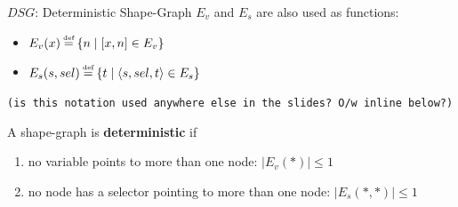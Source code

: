 \documentclass[xcolor={usenames,dvipsnames}]{beamer}
\newcommand{\TODO}[1]{\texttt{\textcolor{YellowOrange}{(#1)}}}
\newcommand\defeq{\stackrel{\mathclap{\tiny\mbox{def}}}{=}}
\begin{document}
\begin{frame}[fragile]{$DSG$: Deterministic Shape-Graph}
  $E_v$ and $E_s$ are also used as functions:
  \begin{itemize}
  \item $E_v(x) \defeq \left\{ n \mid \left[x, n\right] \in E_v \right\}$
  \item $E_s(s, sel) \defeq \left\{ t \mid \langle s, sel, t \rangle \in E_s \right\}$
  \end{itemize}
  \TODO{is this notation used anywhere else in the slides? O/w inline
    below?}

  \vspace{1em}

  A shape-graph is \textbf{deterministic} if
  \begin{enumerate}
  \item no variable points to more than one node: $ |E_v(*)| \leq 1$
  \item no node has a selector pointing to more than one node: $ |E_s(*, *)| \leq 1$
  \end{enumerate}
\end{frame}
\end{document}

